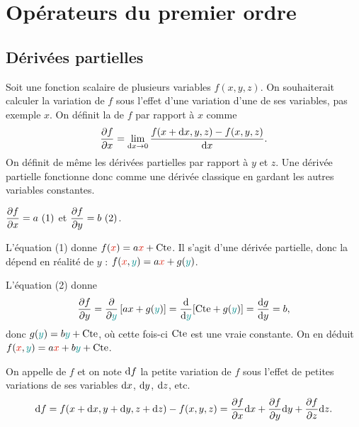 

\Entete[formu][C]{}

\section{Opérateurs du premier ordre}

\subsection{Dérivées partielles}

Soit une fonction scalaire de plusieurs variables $f(x,y,z)$.
On souhaiterait calculer la variation de $f$ sous l'effet d'une variation d'une de ses variables, pas exemple $x$. On définit la  de $f$ par rapport à $x$ comme
$$
\frac{\partial{f}}{\partial{x}} = \lim\limits_{\mathrm{d} x \rightarrow 0}\frac{f(x+\mathrm{d} x,y,z)-f(x,y,z)}{\mathrm{d} x}.
$$
On définit de même les dérivées partielles par rapport à $y$ et $z$.
Une dérivée partielle fonctionne donc comme une dérivée classique en gardant les autres variables constantes.

  $\displaystyle\frac{\partial{f}}{\partial{x}}  = a~\text{(1)}$ et  $\displaystyle\frac{\partial{f}}{\partial{y}}  = b~\text{(2)}$.
 \begin{liste}
 \item

L'équation (1) donne $f(\JRouge{x})  = a \JRouge{x} + \cte$. Il s'agit d'une dérivée partielle, donc la  dépend en réalité de $y$ : $f(\JRouge{x},\JBleu{y})  = a \JRouge{x} + g(\JBleu{y})$.

\item  L'équation (2) donne
$$\dr{f}{y} = \dr{}{\JBleu{y}}\left[ax + g(\JBleu{y})\right] = \dd{}{\JBleu{y}} [\cte + g(\JBleu{y})] =  \dd{g}{y} = b,$$ donc $g(\JBleu{y}) = b\JBleu{y} + \cte$, où cette fois-ci $\text{Cte}$ est une vraie constante. On en déduit $f(\JRouge{x},\JBleu{y}) = a\JRouge{x} + b\JBleu{y} + \cte$.
 \end{liste}

\begin{definition}
On appelle  de $f$ et on note $\mathrm{d} f$ la petite variation de $f$ sous l'effet de petites variations de ses variables $\mathrm{d} x$, $\mathrm{d} y$, $\mathrm{d} z$, etc.
$$
\mathrm{d} f = f(x+\mathrm{d} x,y+\mathrm{d} y, z + \mathrm{d} z) -f(x,y,z) =  \frac{\partial{f}}{\partial{x}} \mathrm{d} x + \frac{\partial{f}}{\partial{y}} \mathrm{d} y  + \frac{\partial{f}}{\partial{z}} \mathrm{d} z.
$$
\end{definition}

